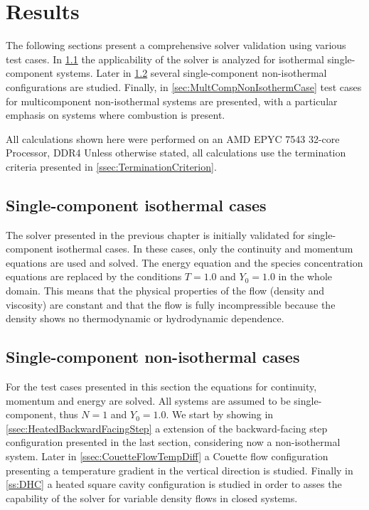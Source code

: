 \chapter{Results}	\label{ch:results}
\glsresetall
The following sections present a comprehensive solver validation using various test cases. In \cref{sec:SingleCompIsotCase} the applicability of the solver is analyzed for isothermal single-component systems. Later in \cref{sec:SinCompNonIsothermCase} several single-component non-isothermal configurations are studied. Finally, in \cref{sec:MultCompNonIsothermCase} test cases for multicomponent non-isothermal systems are presented, with a particular emphasis on systems where combustion is present.

All calculations shown here were performed on an AMD EPYC 7543 32-core Processor, DDR4 %
Unless otherwise stated, all calculations use the termination criteria presented in \cref{ssec:TerminationCriterion}.

\section{Single-component isothermal cases}\label{sec:SingleCompIsotCase}
The solver presented in the previous chapter is initially validated for single-component isothermal cases. In these cases, only the continuity and momentum equations are used and solved. The energy equation and the species concentration equations are replaced by the conditions $T = 1.0$ and $Y_0 = 1.0$ in the whole domain. This means that the physical properties of the flow (density and viscosity) are constant and that the flow is fully incompressible because the density shows no thermodynamic or hydrodynamic dependence.




\section{Single-component non-isothermal cases} \label{sec:SinCompNonIsothermCase}
For the test cases presented in this section the equations for continuity, momentum and energy are solved. All systems are assumed to be single-component, thus $N = 1$ and $Y_0 = 1.0$. We start by showing in \cref{ssec:HeatedBackwardFacingStep} a extension of the backward-facing step configuration presented in the last section, considering now a non-isothermal system. Later in \cref{ssec:CouetteFlowTempDiff} a Couette flow configuration presenting a temperature gradient in the vertical direction is studied. Finally in \cref{ss:DHC} a heated square cavity configuration is studied in order to asses the capability of the solver for variable density flows in closed systems.


